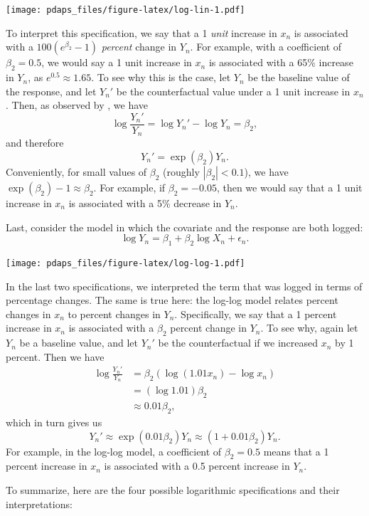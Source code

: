 \documentclass[
  12pt,
  oneside,openany]{book}
\begin{document}
\texttt{[image: pdaps\_files/figure-latex/log-lin-1.pdf]}

To interpret this specification, we say that a 1 \emph{unit} increase in \(x_n\) is associated with a \(100(e^{\beta_2} - 1)\) \emph{percent} change in \(Y_n\).
For example, with a coefficient of \(\beta_2 = 0.5\), we would say a 1 unit increase in \(x_n\) is associated with a 65\% increase in \(Y_n\), as \(e^{0.5} \approx 1.65\).
To see why this is the case, let \(Y_n\) be the baseline value of the response, and let \(Y_n'\) be the counterfactual value under a 1 unit increase in \(x_n\).
Then, as observed by \citet[93--94]{angrist2015mastering}, we have
\[
\log \frac{Y_n'}{Y_n} = \log Y_n' - \log Y_n = \beta_2,
\]
and therefore
\[
Y_n' = \exp(\beta_2) Y_n.
\]
Conveniently, for small values of \(\beta_2\) (roughly \(|\beta_2| < 0.1\)), we have \(\exp(\beta_2) - 1 \approx \beta_2\).
For example, if \(\beta_2 = -0.05\), then we would say that a 1 unit increase in \(x_n\) is associated with a 5\% decrease in \(Y_n\).

Last, consider the model in which the covariate and the response are both logged:
\[
\log Y_n = \beta_1 + \beta_2 \log X_n + \epsilon_n.
\]

\texttt{[image: pdaps\_files/figure-latex/log-log-1.pdf]}

In the last two specifications, we interpreted the term that was logged in terms of percentage changes.
The same is true here: the log-log model relates percent changes in \(x_n\) to percent changes in \(Y_n\).
Specifically, we say that a 1 percent increase in \(x_n\) is associated with a \(\beta_2\) percent change in \(Y_n\).
To see why, again let \(Y_n\) be a baseline value, and let \(Y_n'\) be the counterfactual if we increased \(x_n\) by 1 percent.
Then we have
\[
\begin{aligned}
\log \frac{Y_n'}{Y_n}
&= \beta_2 (\log(1.01 x_n) - \log x_n) \\
&= (\log 1.01) \beta_2 \\
&\approx 0.01 \beta_2,
\end{aligned}
\]
which in turn gives us
\[
Y_n' \approx \exp(0.01 \beta_2) Y_n \approx (1 + 0.01 \beta_2) Y_n.
\]
For example, in the log-log model, a coefficient of \(\beta_2 = 0.5\) means that a 1 percent increase in \(x_n\) is associated with a 0.5 percent increase in \(Y_n\).

To summarize, here are the four possible logarithmic specifications and their interpretations:
\end{document}
